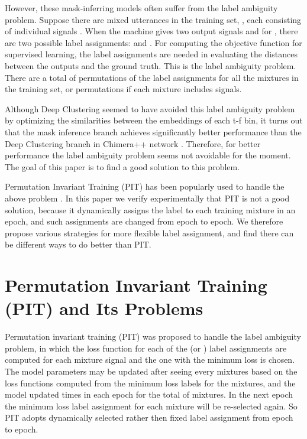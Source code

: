 \documentclass{article}
\begin{document}
However, these mask-inferring models often suffer from the label ambiguity problem. Suppose there are  mixed utterances in the training set,  , each consisting of  individual signals . When the machine gives two output signals  and  for , there are two possible label assignments:  and . For computing the objective function for supervised learning, the label assignments are needed in evaluating the distances between the outputs and the ground truth. This is the label ambiguity problem. There are a total of  permutations of the label assignments for all the  mixtures in the training set, or  permutations if each mixture includes  signals.


Although Deep Clustering seemed to have avoided this label ambiguity problem by optimizing the similarities between the embeddings of each t-f bin, it turns out that the mask inference branch achieves significantly better performance than the Deep Clustering branch in Chimera++ network \cite{wang2018alternative}. Therefore, for better performance the label ambiguity problem seems not avoidable for the moment. The goal of this paper is to find a good solution to this problem.


Permutation Invariant Training (PIT) has been popularly used to handle the above problem \cite{yu2017permutation,kolbaek2017multitalker}. In this paper we verify experimentally that PIT is not a good solution, because it dynamically assigns the label to each training mixture in an epoch, and such assignments are changed from epoch to epoch. We therefore propose various strategies for more flexible label assignment, and find there can be different ways to do better than PIT.







\vspace{-7pt}
\section{Permutation Invariant Training (PIT) and Its Problems}

Permutation invariant training (PIT) was proposed to handle the label ambiguity problem, in which the loss function for each of the  (or ) label assignments are computed for each mixture signal  and the one with the minimum loss is chosen. The model parameters may be updated after seeing every  mixtures based on the  loss functions computed from the minimum loss labels for the  mixtures, and the model updated  times in each epoch for the total of  mixtures. In the next epoch the minimum loss label assignment for each mixture will be re-selected again. So PIT adopts dynamically selected rather then fixed label assignment from epoch to epoch.
\end{document}
